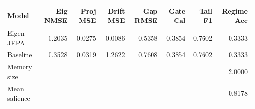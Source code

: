 \begin{tabular}{lrrrrrrr}
\toprule
Model & Eig NMSE & Proj MSE & Drift MSE & Gap RMSE & Gate Cal & Tail F1 & Regime Acc \\
\midrule
Eigen-JEPA & 0.2035 & 0.0275 & 0.0086 & 0.5358 & 0.3854 & 0.7602 & 0.3333 \\
Baseline & 0.3528 & 0.0319 & 1.2622 & 0.7608 & 0.3854 & 0.7602 & 0.3333 \\
\midrule
Memory size & \multicolumn{7}{r}{2.0000} \\
Mean salience & \multicolumn{7}{r}{0.8178} \\
\bottomrule
\end{tabular}